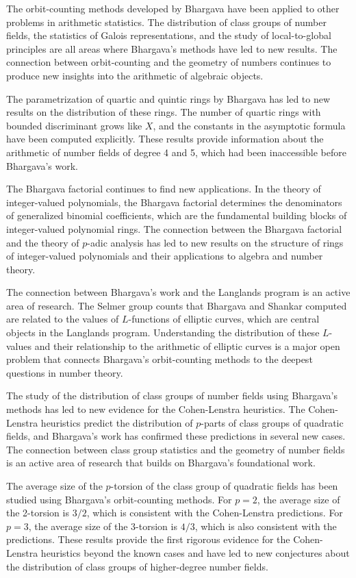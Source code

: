 The orbit-counting methods developed by Bhargava have been applied to other problems in arithmetic statistics. The distribution of class groups of number fields, the statistics of Galois representations, and the study of local-to-global principles are all areas where Bhargava's methods have led to new results. The connection between orbit-counting and the geometry of numbers continues to produce new insights into the arithmetic of algebraic objects.

The parametrization of quartic and quintic rings by Bhargava has led to new results on the distribution of these rings. The number of quartic rings with bounded discriminant grows like $X$, and the constants in the asymptotic formula have been computed explicitly. These results provide information about the arithmetic of number fields of degree 4 and 5, which had been inaccessible before Bhargava's work.

The Bhargava factorial continues to find new applications. In the theory of integer-valued polynomials, the Bhargava factorial determines the denominators of generalized binomial coefficients, which are the fundamental building blocks of integer-valued polynomial rings. The connection between the Bhargava factorial and the theory of $p$-adic analysis has led to new results on the structure of rings of integer-valued polynomials and their applications to algebra and number theory.

The connection between Bhargava's work and the Langlands program is an active area of research. The Selmer group counts that Bhargava and Shankar computed are related to the values of $L$-functions of elliptic curves, which are central objects in the Langlands program. Understanding the distribution of these $L$-values and their relationship to the arithmetic of elliptic curves is a major open problem that connects Bhargava's orbit-counting methods to the deepest questions in number theory.

The study of the distribution of class groups of number fields using Bhargava's methods has led to new evidence for the Cohen-Lenstra heuristics. The Cohen-Lenstra heuristics predict the distribution of $p$-parts of class groups of quadratic fields, and Bhargava's work has confirmed these predictions in several new cases. The connection between class group statistics and the geometry of number fields is an active area of research that builds on Bhargava's foundational work.

The average size of the $p$-torsion of the class group of quadratic fields has been studied using Bhargava's orbit-counting methods. For $p=2$, the average size of the 2-torsion is $3/2$, which is consistent with the Cohen-Lenstra predictions. For $p=3$, the average size of the 3-torsion is $4/3$, which is also consistent with the predictions. These results provide the first rigorous evidence for the Cohen-Lenstra heuristics beyond the known cases and have led to new conjectures about the distribution of class groups of higher-degree number fields.

